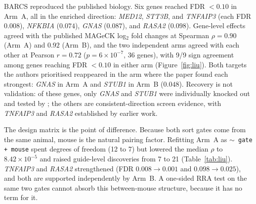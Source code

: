 BARCS reproduced the published biology.  Six genes reached FDR $<0.10$ in Arm~A,
all in the enriched direction: \textit{MED12}, \textit{STT3B}, and
\textit{TNFAIP3} (each FDR $0.008$), \textit{NFKBIA} ($0.074$), \textit{GNAS}
($0.087$), and \textit{RASA2} ($0.098$).  Gene-level effects agreed with the
published MAGeCK log$_2$ fold changes at Spearman $\rho=0.90$ (Arm~A) and $0.92$
(Arm~B), and the two independent arms agreed with each other at Pearson
$r=0.72$ ($p=6\times10^{-7}$, 36 genes), with 9/9 sign agreement among genes
reaching FDR $<0.10$ in either arm (Figure~\ref{fig:liu}).  Both targets the
authors prioritised reappeared in the arm where the paper found each strongest:
\textit{GNAS} in Arm~A and \textit{STUB1} in Arm~B ($0.048$).  Recovery is not
validation: of these genes, only \textit{GNAS} and \textit{STUB1} were
individually knocked out and tested by \citet{liu2026invivo}; the others are
consistent-direction screen evidence, with \textit{TNFAIP3} and \textit{RASA2}
established by earlier work.

The design matrix is the point of difference.  Because both sort gates come from
the same animal, mouse is the natural pairing factor.  Refitting Arm~A as
\texttt{$\sim$ gate + mouse} spent degrees of freedom (12 to 7) but lowered the
median $\rho$ to $8.42\times10^{-5}$ and raised guide-level discoveries from 7 to
21 (Table~\ref{tab:liu}).  \textit{TNFAIP3} and \textit{RASA2} strengthened
(FDR $0.008\to0.001$ and $0.098\to0.025$), and both are supported independently
by Arm~B.  A one-sided RRA test on the same two gates cannot absorb this
between-mouse structure, because it has no term for it.

